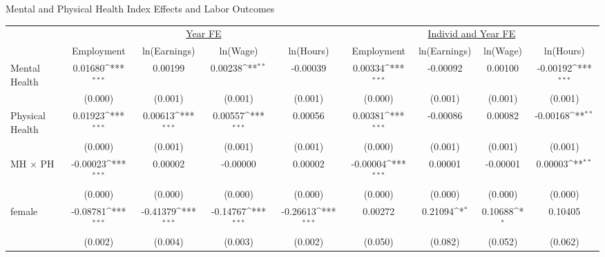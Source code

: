 \def\sym#1{\ifmmode^{#1}\else\(^{#1}\)\fi}
\center\caption{Mental and Physical Health Index Effects and Labor Outcomes}
\tiny\begin{tabular}{l*{8}{c}}
                    &\multicolumn{4}{c}{\underline{Year FE}}                                                &\multicolumn{4}{c}{\underline{Individ and Year FE}}                                    \\\cmidrule(lr){2-5}\cmidrule(lr){6-9}
                    &\multicolumn{1}{c}{Employment}&\multicolumn{1}{c}{ln(Earnings)}&\multicolumn{1}{c}{ln(Wage)}&\multicolumn{1}{c}{ln(Hours)}&\multicolumn{1}{c}{Employment}&\multicolumn{1}{c}{ln(Earnings)}&\multicolumn{1}{c}{ln(Wage)}&\multicolumn{1}{c}{ln(Hours)}\\
\hline
Mental Health       &     0.01680\sym{***}&     0.00199         &     0.00238\sym{**} &    -0.00039         &     0.00334\sym{***}&    -0.00092         &     0.00100         &    -0.00192\sym{***}\\
                    &     (0.000)         &     (0.001)         &     (0.001)         &     (0.001)         &     (0.000)         &     (0.001)         &     (0.001)         &     (0.001)         \\
Physical Health     &     0.01923\sym{***}&     0.00613\sym{***}&     0.00557\sym{***}&     0.00056         &     0.00381\sym{***}&    -0.00086         &     0.00082         &    -0.00168\sym{**} \\
                    &     (0.000)         &     (0.001)         &     (0.001)         &     (0.001)         &     (0.000)         &     (0.001)         &     (0.001)         &     (0.001)         \\
MH $\times$ PH      &    -0.00023\sym{***}&     0.00002         &    -0.00000         &     0.00002         &    -0.00004\sym{***}&     0.00001         &    -0.00001         &     0.00003\sym{**} \\
                    &     (0.000)         &     (0.000)         &     (0.000)         &     (0.000)         &     (0.000)         &     (0.000)         &     (0.000)         &     (0.000)         \\
female              &    -0.08781\sym{***}&    -0.41379\sym{***}&    -0.14767\sym{***}&    -0.26613\sym{***}&     0.00272         &     0.21094\sym{*}  &     0.10688\sym{*}  &     0.10405         \\
                    &     (0.002)         &     (0.004)         &     (0.003)         &     (0.002)         &     (0.050)         &     (0.082)         &     (0.052)         &     (0.062)         \\

\end{tabular}
